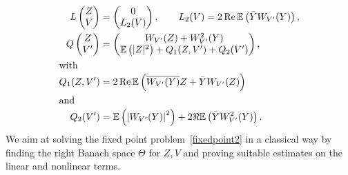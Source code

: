 \documentclass[10pt]{amsart}
\theoremstyle{definition}\newtheorem{defi}[theo]{Definition}\newtheorem{rema}[theo]{Remark}\newtheorem{exam}[theo]{Example}\newtheorem{exem}[theo]{Example}\newtheorem{nota}[theo]{Notation}
\newcommand{\E}{\mathbb{E}}
\DeclareMathOperator{\Rel}{Re}
\begin{document}
\begin{align} 
L
\begin{pmatrix} Z \\ V
\end{pmatrix} &=
\begin{pmatrix}
0 \\ L_2(V)
\end{pmatrix}, \qquad L_2(V)=2 \Rel \E\left(\bar Y W_{V'}(Y)\right),\label{def:L2}
\\
Q
\begin{pmatrix} Z \\ V'
\end{pmatrix} &=
\begin{pmatrix}
W_{V'}(Z) + W_{V'}^2(Y) \\
\E\left(|Z|^2\right) + Q_1 (Z,V') + Q_2(V')
\end{pmatrix},\label{def:Q}
\\
\intertext{with}
Q_1(Z,V') &= 2 \Rel \E\left(\overline{W_{V'}(Y)} Z + \bar Y W_{V'}(Z)\right)\label{def:Q1}
\\
\intertext{and}
Q_2 (V') &= \E \left(\left|W_{V'}(Y)\right|^2\right) +2 \Re \E\left(\bar Y W_{V'}^2 (Y)\right).\label{def:Q2}
\end{align}
We aim at solving the fixed point problem~\eqref{fixedpoint2} in a classical way by finding the right Banach space $\Theta$ for $Z,V$ and proving suitable estimates on the linear and nonlinear terms.
\end{document}
